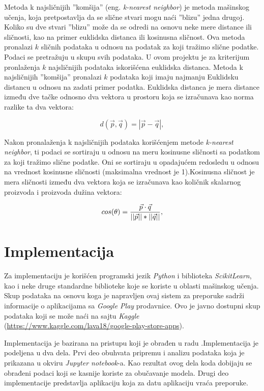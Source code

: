 \documentclass[a4paper,12pt,titlepage]{article}
\begin{document}
Metoda k najsličnijih ''komšija'' (eng. \emph{k-nearest neighbor}) je metoda mašinskog učenja, koja pretpostavlja da se slične stvari mogu naći ''blizu'' jedna drugoj. Koliko su dve stvari ''blizu'' može da se odredi na osnovu neke mere distance ili sličnosti, kao na primer euklidska distanca ili kosinusna sličnost. Ova metoda pronalazi $k$ sličnih podataka u odnosu na podatak za koji tražimo slične podatke. Podaci se pretražuju u skupu svih podataka. U ovom projektu je za kriterijum pronlaženja $k$ najsličnijih podataka iskorišćena euklidska distanca. Metoda k najsličnijih ''komšija'' pronalazi $k$ podataka koji imaju najmanju Euklidsku distancu u odnosu na zadati primer podatka. Euklidska distanca je mera distance između dve tačke odnosno dva vektora u prostoru koja se izračunava kao norma razlike ta dva vektora:

\begin{equation}
d(\vec{p}, \vec{q}) = |\vec{p} - \vec{q}|,
\end{equation}

Nakon pronalaženja k najsličnijih podataka korišćenjem metode \emph{k-nearest neighbor}, ti podaci se sortiraju u odnosu na meru kosinusne sličnosti sa podatkom za koji tražimo slične podatke. Oni se sortiraju u opadajućem redosledu u odnosu na vrednost kosinusne sličnosti (maksimalna vrednost je 1).Kosinusna sličnost je mera sličnosti između dva vektora koja se izračunava kao količnik skalarnog proizvoda i proizvoda dužina vektora:

\begin{equation}
cos(\theta) = {\vec{p} \cdot \vec{q} \over ||\vec{p}|| * ||\vec{q}||},
\end{equation}



\section{Implementacija}

Za implementaciju je korišćen programski jezik \emph{Python} i biblioteka \emph{ScikitLearn}, kao i neke druge standardne biblioteke koje se koriste u oblasti mašinskog učenja. Skup podataka na osnovu koga je napravljen ovaj sistem za preporuke sadrži informacije o aplikacijama sa \emph{Google Play} prodavnice. Ovo je javno dostupni skup podataka koji se može naći na sajtu \emph{Kaggle} (\href{https://www.kaggle.com/lava18/google-play-store-apps}{https://www.kaggle.com/lava18/google-play-store-apps}).

Implementacija je bazirana na pristupu koji je obrađen u radu \cite{RecommendSystemPaper}.Implementacija je podeljena u dva dela. Prvi deo obuhvata pripremu i analizu podataka koja je prikazana u okviru \emph{Jupyter notebook}-a. Kao rezultat ovog dela koda dobijaju se obrađeni podaci koji se kasnije koriste za obučavanje modela. Drugi deo implementacije predstavlja aplikaciju koja za datu aplikaciju vraća preporuke.
\end{document}
